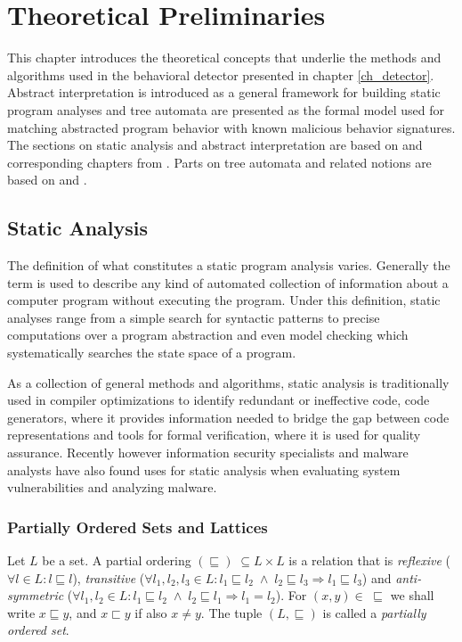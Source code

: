 \chapter{Theoretical Preliminaries}
\label{ch_math}
This chapter introduces the theoretical concepts that underlie the methods and algorithms used in the behavioral detector presented in chapter \ref{ch_detector}. Abstract interpretation is introduced as a general framework for building static program analyses and tree automata are presented as the formal model used for matching abstracted program behavior with known malicious behavior signatures. The sections on static analysis and abstract interpretation are based on \cite{FAV_Slides16} and corresponding chapters from \cite{Nielson05}. Parts on tree automata and related notions are based on \cite{tata07} and \cite{Babic11}.

\section{Static Analysis}
The definition of what constitutes a static program analysis varies. Generally the term is used to describe any kind of automated collection of information about a computer program without executing the program. Under this definition, static analyses range from a simple search for syntactic patterns to precise computations over a program abstraction and even model checking which systematically searches the state space of a program.

As a collection of general methods and algorithms, static analysis is traditionally used in compiler optimizations to identify redundant or ineffective code, code generators, where it provides information needed to bridge the gap between code representations and tools for formal verification, where it is used for quality assurance. Recently however information security specialists and malware analysts have also found uses for static analysis when evaluating system vulnerabilities and analyzing malware.

\subsection{Partially Ordered Sets and Lattices}
\begin{defn}
Let $L$ be a set. A partial ordering $(\sqsubseteq) \; \subseteq L \times L$ is a relation that is \emph{reflexive} ($\forall l \in L: l \sqsubseteq l$), \emph{transitive} ($\forall l_1, l_2, l_3 \in L: l_1 \sqsubseteq l_2 \; \wedge \; l_2 \sqsubseteq l_3 \Rightarrow l_1 \sqsubseteq l_3$) and \emph{anti-symmetric} ($\forall l_1, l_2 \in L: l_1 \sqsubseteq l_2 \; \wedge \; l_2 \sqsubseteq l_1 \Rightarrow l_1 = l_2$). For $(x,y) \in \; \sqsubseteq$ we shall write $x \sqsubseteq y$, and $x \sqsubset y$ if also $x \neq y$. The tuple $(L, \sqsubseteq)$ is called a \emph{partially ordered set}.
\end{defn}

